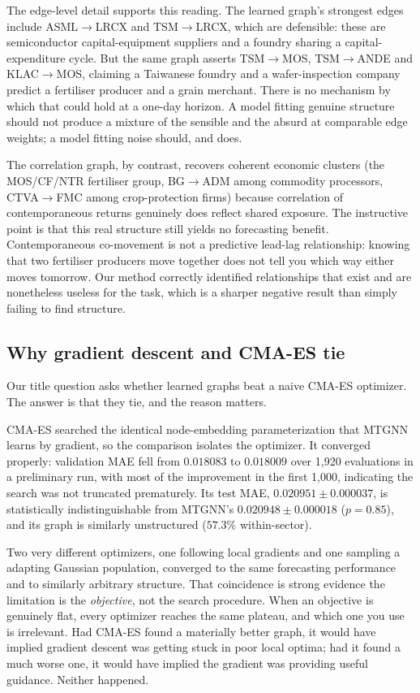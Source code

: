 The edge-level detail supports this reading. The learned graph's strongest edges include ASML$\rightarrow$LRCX and TSM$\rightarrow$LRCX, which are defensible: these are semiconductor capital-equipment suppliers and a foundry sharing a capital-expenditure cycle. But the same graph asserts TSM$\rightarrow$MOS, TSM$\rightarrow$ANDE and KLAC$\rightarrow$MOS, claiming a Taiwanese foundry and a wafer-inspection company predict a fertiliser producer and a grain merchant. There is no mechanism by which that could hold at a one-day horizon. A model fitting genuine structure should not produce a mixture of the sensible and the absurd at comparable edge weights; a model fitting noise should, and does.

The correlation graph, by contrast, recovers coherent economic clusters (the MOS/CF/NTR fertiliser group, BG$\rightarrow$ADM among commodity processors, CTVA$\rightarrow$FMC among crop-protection firms) because correlation of contemporaneous returns genuinely does reflect shared exposure. The instructive point is that this real structure still yields no forecasting benefit. Contemporaneous co-movement is not a predictive lead-lag relationship: knowing that two fertiliser producers move together does not tell you which way either moves tomorrow. Our method correctly identified relationships that exist and are nonetheless useless for the task, which is a sharper negative result than simply failing to find structure.

\subsection{Why gradient descent and CMA-ES tie}

Our title question asks whether learned graphs beat a naive CMA-ES optimizer. The answer is that they tie, and the reason matters.

CMA-ES searched the identical node-embedding parameterization that MTGNN learns by gradient, so the comparison isolates the optimizer. It converged properly: validation MAE fell from $0.018083$ to $0.018009$ over 1{,}920 evaluations in a preliminary run, with most of the improvement in the first 1{,}000, indicating the search was not truncated prematurely. Its test MAE, $0.020951 \pm 0.000037$, is statistically indistinguishable from MTGNN's $0.020948 \pm 0.000018$ ($p = 0.85$), and its graph is similarly unstructured ($57.3\%$ within-sector).

Two very different optimizers, one following local gradients and one sampling a adapting Gaussian population, converged to the same forecasting performance and to similarly arbitrary structure. That coincidence is strong evidence the limitation is the \emph{objective}, not the search procedure. When an objective is genuinely flat, every optimizer reaches the same plateau, and which one you use is irrelevant. Had CMA-ES found a materially better graph, it would have implied gradient descent was getting stuck in poor local optima; had it found a much worse one, it would have implied the gradient was providing useful guidance. Neither happened.

